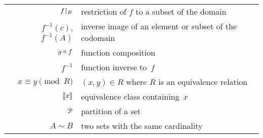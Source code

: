 \begin{center}
\begin{tabular}{r|l}
    ${f}\mathord\upharpoonright_{B}$  &restriction of $f$ to a subset of the domain \\
    $f^{-1}(c)$, $f^{-1}(A)$  &inverse image of an element or subset of the codomain \\
    $g\mathbin{\circ} f$  &function composition   \\
    $f^{-1}$  &function inverse to~$f$  \\
    $x\equiv y\pmod R$  &$(x,y)\in R$ where $R$ is an equivalence relation \\ 
    $\llbracket x \rrbracket$  &equivalence class containing~$x$  \\
    $\EuScript{P}$  &partition of a set  \\
    $A\sim B$  &two sets with the same cardinality
  \end{tabular}
\end{center}
\vspace*{\fill}
